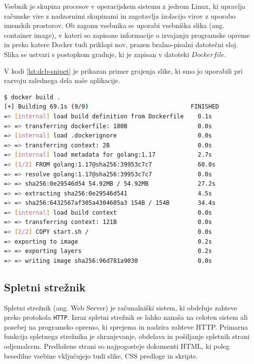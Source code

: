 Vsebnik je skupina procesov v operacijskem sistemu z jedrom Linux, ki upravlja računske vire z nadzornimi skupinami in zagotavlja izolacijo virov z uporabo imenskih prostorov. Ob zagonu vsebnika se uporabi vsebniška slika (ang. container image), v kateri so zapisane informacije o izvajanju programske opreme in preko katere Docker tudi priklopi nov, prazen bralno-pisalni datotečni sloj. Slika se ustvari s postopkom gradnje, ki je zapisan v datoteki $Dockerfile$.

V kodi \ref{lst:dcb-snipet} je prikazan primer grajenja slike, ki smo jo uporabili pri razvoju zalednega dela naše aplikacije.
\begin{lstlisting}[language=bash, style=mystyle,caption={Grajenje slike Docker vsebnika.},label=lst:dcb-snipet]
$ docker build .
[+] Building 69.1s (9/9)                             FINISHED
=> [internal] load build definition from Dockerfile    0.1s
=> => transferring dockerfile: 180B                    0.0s
=> [internal] load .dockerignore                       0.0s
=> => transferring context: 2B                         0.0s
=> [internal] load metadata for golang:1.17            2.7s
=> [1/2] FROM golang:1.17@sha256:39953c7c7             60.0s
=> => resolve golang:1.17@sha256:39953c7c7             0.0s
=> => sha256:0e29546d54 54.92MB / 54.92MB              27.2s
=> => extracting sha256:0e29546d541                    4.5s
=> => sha256:6432567af305a4304605a3 154B / 154B        34.4s
=> [internal] load build context                       0.0s
=> => transferring context: 121B                       0.0s
=> [2/2] COPY start.sh /                               0.0s
=> exporting to image                                  0.2s
=> => exporting layers                                 0.2s
=> => writing image sha256:96d781a9030                 0.0s
\end{lstlisting}

\subsection{Spletni strežnik}

Spletni strežnik (ang. Web Server) je računalniški sistem, ki obdeluje zahteve preko protokola \verb=HTTP=. Izraz spletni strežnik se lahko nanaša na celoten sistem ali posebej na programsko opremo, ki sprejema in nadzira zahteve HTTP. Primarna funkcija spletnega strežnika je shranjevanje, obdelava in pošiljanje spletnih strani odjemalcem. Predložene strani so najpogosteje dokumenti HTML, ki poleg besedilne vsebine vključujejo tudi slike, CSS predloge in skripte.

